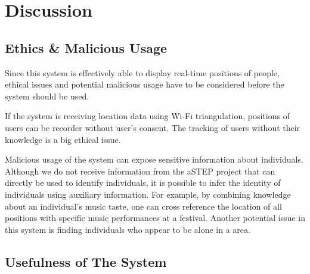 \chapter{Discussion}


\section{Ethics \& Malicious Usage}
Since this system is effectively able to display real-time positions of people, ethical issues and potential malicious usage have to be considered before the system should be used. 

If the system is receiving location data using Wi-Fi triangulation, positions of users can be recorder without user's consent. The tracking of users without their knowledge is a big ethical issue.

Malicious usage of the system can expose sensitive information about individuals. Although we do not receive information from the aSTEP project that can directly be used to identify individuals, it is possible to infer the identity of individuals using auxiliary information. For example, by combining knowledge about an individual's music taste, one can cross reference the location of all positions with specific music performances at a festival. Another potential issue in this system is finding individuals who appear to be alone in a area. 

\section{Usefulness of The System}
